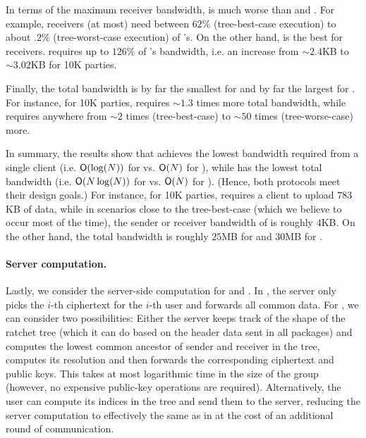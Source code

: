 In terms of the maximum receiver bandwidth, \protITK is much worse than \saik and \protCMPKE. For
example, \saik receivers (at most) need between $62\%$ (tree-best-case execution) to about $.2\%$ (tree-worst-case
execution) of \protITK's. On the other hand, \protCMPKE is the best for receivers.  \saik requires up
to $126\%$ of \protCMPKE's bandwidth, i.e. an increase from $\sim 2.4$KB to $\sim 3.02$KB for 10K parties.

Finally, the total bandwidth is by far the smallest for \protCMPKE and by far the largest for \protITK. For instance,
for 10K parties, \saik requires $\sim1.3$ times more total bandwidth, while \protITK requires anywhere from $\sim2$
times (tree-best-case) to $\sim50$ times (tree-worse-case) more.

In summary, the results show that \saik achieves the lowest bandwidth required from a single client
(i.e. $\textsf{O}(\log(N))$ for \saik vs. $\textsf{O}(N)$ for \protCMPKE), while \protCMPKE has the lowest total bandwidth
(i.e. $\textsf{O}(N\log(N))$ for \saik vs. $\textsf{O}(N)$ for \protCMPKE). (Hence, both protocols meet their design goals.) For instance, for 10K parties, \protCMPKE requires a client to upload $783$KB of data, while in scenarios close to the tree-best-case (which we believe to occur most of the time), the sender or receiver bandwidth of \saik is roughly $4$KB. On the other hand, the total bandwidth is roughly $25$MB for \protCMPKE and $30$MB for \saik.

\paragraph{Server computation.}
Lastly, we consider the server-side computation for \saik and \protCMPKE. In \protCMPKE, the server only picks the
$i$-th \mPKE ciphertext for the $i$-th user and forwards all common data. For \saik, we can consider two possibilities:
Either the server keeps track of the shape of the ratchet tree (which it can do based on the header data sent in all
packages) and computes the lowest common ancestor of sender and receiver in the tree, computes its resolution and then
forwards the corresponding ciphertext and public keys. This takes at most logarithmic time in the size of the
group (however, no expensive public-key operations are required). Alternatively, the user can compute its indices in the
tree and send them to the server, reducing the server computation to effectively the same as in \protCMPKE at the cost
of an additional round of communication.

